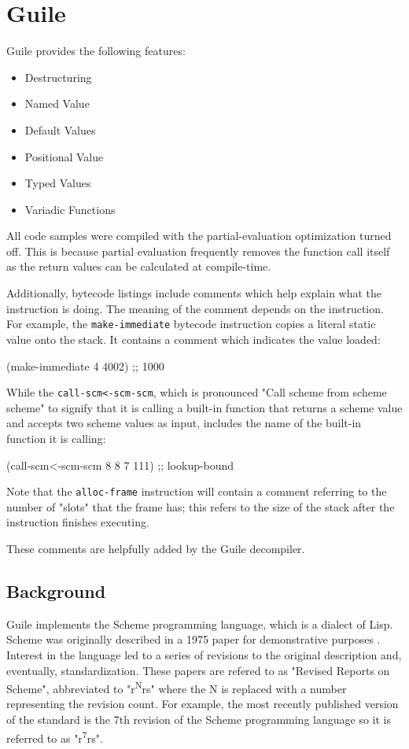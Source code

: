 \section{Guile}

Guile provides the following features:

\begin{itemize}
  \item{Destructuring}
  \item{Named Value}
  \item{Default Values}
  \item{Positional Value}
  \item{Typed Values}
  \item{Variadic Functions}
\end{itemize}

All code samples were compiled with the partial-evaluation optimization turned off.
This is because partial evaluation frequently removes the function call itself as the
return values can be calculated at compile-time.

Additionally, bytecode listings include comments which help explain what the instruction
is doing.
The meaning of the comment depends on the instruction.
For example, the \texttt{make-immediate} bytecode instruction copies a literal static
value onto the stack.
It contains a comment which indicates the value loaded:

\begin{pygmented}[lang=lisp]
(make-immediate 4 4002)         ;; 1000
\end{pygmented}

While the \texttt{call-scm<-scm-scm}, which is pronounced "Call scheme from scheme scheme"
to signify that it is calling a built-in function that returns a scheme value and accepts
two scheme values as input, includes the name of the built-in function it is calling:

\begin{pygmented}[lang=lisp]
(call-scm<-scm-scm 8 8 7 111)   ;; lookup-bound
\end{pygmented}

Note that the \texttt{alloc-frame} instruction will contain a comment referring to the
number of "slots" that the frame has; this refers to the size of the stack after the
instruction finishes executing.

These comments are helpfully added by the Guile decompiler.

\subsection{Background}
Guile implements the Scheme programming language, which is a dialect of Lisp.
Scheme was originally described in a 1975 paper for demonstrative purposes
\parencite[][page 1]{r0rs}.
Interest in the language led to a series of revisions to the original description and,
eventually, standardization.
These papers are refered to as "Revised Reports on Scheme", abbreviated to
"r\textsuperscript{N}rs" where the N is replaced with a number representing the revision
count.
For example, the most recently published version of the standard is the 7th revision of
the Scheme programming language so it is referred to as "r\textsuperscript{7}rs".

